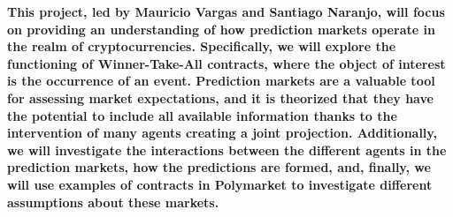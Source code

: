 {\bfseries
	This project, led by Mauricio Vargas and Santiago Naranjo, will focus on providing an understanding of how prediction markets operate in the realm of cryptocurrencies. Specifically, we will explore the functioning of Winner-Take-All contracts, where the object of interest is the occurrence of an event.  Prediction markets are a valuable tool for assessing market expectations, and it is theorized that they have the potential to include all available information thanks to the intervention of many agents creating a joint projection. Additionally, we will investigate the interactions between the different agents in the prediction markets, how the predictions are formed, and, finally, we will use examples of contracts in Polymarket to investigate different assumptions about these markets.
}\par
